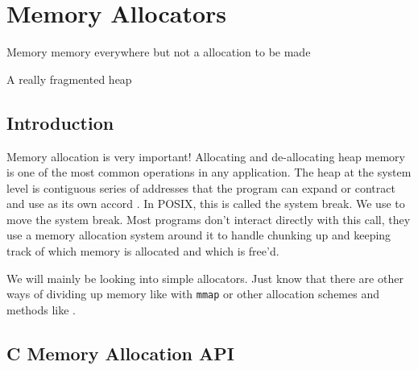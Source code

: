 \chapter{Memory Allocators}

\epigraph{Memory memory everywhere but not a allocation to be made}{A really fragmented heap}

\section{Introduction}

Memory allocation is very important!
Allocating and de-allocating heap memory is one of the most common operations in any application.
The heap at the system level is contiguous series of addresses that the program can expand or contract and use as its own accord \cite{mallocinternals}.
In POSIX, this is called the system break.
We use  to move the system break.
Most programs don't interact directly with this call, they use a memory allocation system around it to handle chunking up and keeping track of which memory is allocated and which is free'd.

We will mainly be looking into simple allocators.
Just know that there are other ways of dividing up memory like with \texttt{mmap} or other allocation schemes and methods like .

\section{C Memory Allocation API}

